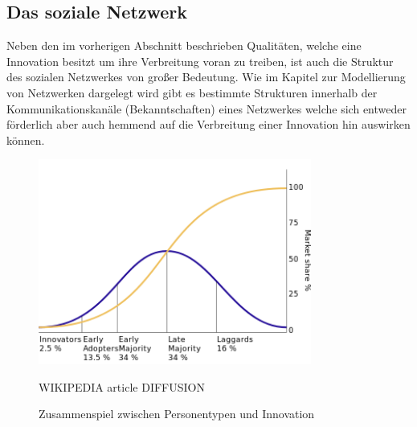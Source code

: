 \documentclass[12pt]{article}
\begin{document}
\subsection{Das soziale Netzwerk}
Neben den im vorherigen Abschnitt beschrieben Qualitäten, welche eine Innovation besitzt um ihre Verbreitung voran zu treiben, ist auch die Struktur des sozialen Netzwerkes von großer Bedeutung. Wie im Kapitel zur Modellierung von Netzwerken dargelegt wird gibt es bestimmte Strukturen innerhalb der Kommunikationskanäle (Bekanntschaften) eines Netzwerkes welche sich entweder förderlich aber auch hemmend auf die Verbreitung einer Innovation hin auswirken können.
\begin{figure}
  \begin{center}
    \includegraphics[width=0.80\textwidth]{pic_diffusion.png}
  \end{center}
  \caption{Zusammenspiel zwischen Personentypen und Innovation}
  WIKIPEDIA article DIFFUSION
  \label{pic_diffusion}
\end{figure}
\end{document}
